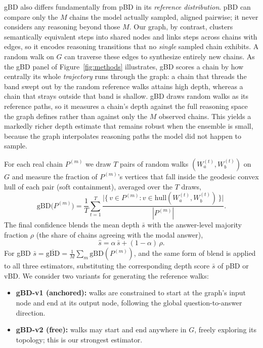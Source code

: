 \documentclass[letterpaper]{article} %
\begin{document}
gBD also differs fundamentally from pBD in its \emph{reference distribution}. pBD
can compare only the $M$ chains the model actually sampled, aligned pairwise; it
never considers any reasoning beyond those $M$. Our graph, by contrast, clusters
semantically equivalent steps into shared nodes and links steps across chains
with edges, so it encodes reasoning transitions that no \emph{single} sampled
chain exhibits. A random walk on $G$ can traverse these edges to synthesize
entirely new chains. As the gBD panel of Figure~\ref{fig:methods} illustrates,
gBD scores a chain by how centrally its whole \emph{trajectory} runs through the
graph: a chain that threads the band swept out by the random reference walks
attains high depth, whereas a chain that strays outside that band is shallow. gBD draws random walks as its
reference paths, so it measures a chain's depth against the full reasoning space
the graph defines rather than against only the $M$ observed chains. This yields a
markedly richer depth estimate that remains robust when the ensemble is small,
because the graph interpolates reasoning paths the model did not happen to sample.

For each real chain $P^{(m)}$ we draw $T$ pairs of random walks
$(W_a^{(t)}, W_b^{(t)})$ on $G$ and measure the fraction of $P^{(m)}$'s vertices
that fall inside the geodesic convex hull of each pair (soft containment),
averaged over the $T$ draws,
\begin{equation}
  \text{gBD}\big(P^{(m)}\big) = \frac{1}{T} \sum_{t=1}^{T}
  \frac{\big|\{\, v \in P^{(m)} : v \in \text{hull}(W_a^{(t)}, W_b^{(t)}) \,\}\big|}{|P^{(m)}|}.
\end{equation}
The final confidence blends the mean depth $\bar{s}$ with the answer-level
majority fraction $\rho$ (the share of chains agreeing with the modal answer),
\begin{equation}
\label{eq:blend}
  \hat{s} = \alpha \, \bar{s} + (1 - \alpha)\, \rho.
\end{equation}
For gBD $\bar{s} = \overline{\text{gBD}} = \frac{1}{M}\sum_m \text{gBD}(P^{(m)})$,
and the same form of blend is applied to all three estimators, substituting the
corresponding depth score $\bar{s}$ of pBD or vBD. We consider two variants for generating
the reference walks:
\begin{itemize}
  \item \textbf{gBD-v1 (anchored):} walks are constrained to start at the graph's
        input node and end at its output node, following the global
        question-to-answer direction.
  \item \textbf{gBD-v2 (free):} walks may start and end anywhere in $G$, freely
        exploring its topology; this is our strongest estimator.
\end{itemize}
\end{document}
